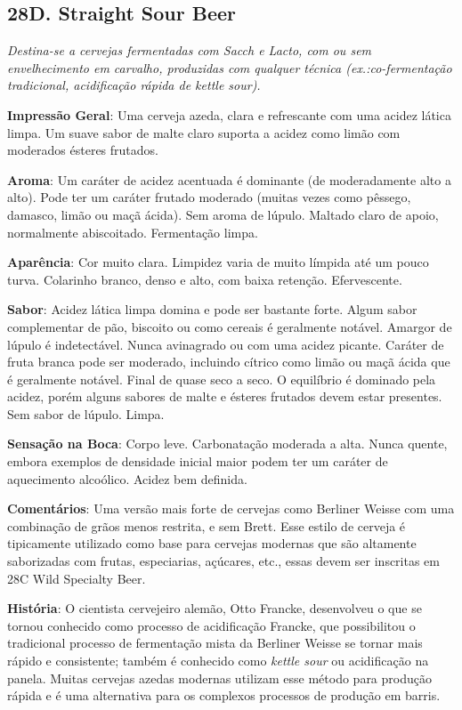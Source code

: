 \subsection*{28D. Straight Sour Beer}
\textit{Destina-se a cervejas fermentadas com Sacch e Lacto, com ou sem envelhecimento em carvalho, produzidas com qualquer técnica (ex.:co-fermentação tradicional, acidificação rápida de kettle sour).}

\textbf{Impressão Geral}: Uma cerveja azeda, clara e refrescante com uma acidez lática limpa. Um suave sabor de malte claro suporta a acidez como limão com moderados ésteres frutados.

\textbf{Aroma}: Um caráter de acidez acentuada é dominante (de moderadamente alto a alto). Pode ter um caráter frutado moderado (muitas vezes como pêssego, damasco, limão ou maçã ácida). Sem aroma de lúpulo. Maltado claro de apoio, normalmente abiscoitado. Fermentação limpa.

\textbf{Aparência}: Cor muito clara. Limpidez varia de muito límpida até um pouco turva. Colarinho branco, denso e alto, com baixa retenção. Efervescente.

\textbf{Sabor}: Acidez lática limpa domina e pode ser bastante forte. Algum sabor complementar de pão, biscoito ou como cereais é geralmente notável. Amargor de lúpulo é indetectável. Nunca avinagrado ou com uma acidez picante. Caráter de fruta branca pode ser moderado, incluindo cítrico como limão ou maçã ácida que é geralmente notável. Final de quase seco a seco. O equilíbrio é dominado pela acidez, porém alguns sabores de malte e ésteres frutados devem estar presentes. Sem sabor de lúpulo. Limpa.

\textbf{Sensação na Boca}: Corpo leve. Carbonatação moderada a alta. Nunca quente, embora exemplos de densidade inicial maior podem ter um caráter de aquecimento alcoólico. Acidez bem definida.

\textbf{Comentários}: Uma versão mais forte de cervejas como Berliner Weisse com uma combinação de grãos menos restrita, e sem Brett. Esse estilo de cerveja é tipicamente utilizado como base para cervejas modernas que são altamente saborizadas com frutas, especiarias, açúcares, etc., essas devem ser inscritas em 28C Wild Specialty Beer.

\textbf{História}: O cientista cervejeiro alemão, Otto Francke, desenvolveu o que se tornou conhecido como processo de acidificação Francke, que possibilitou o tradicional processo de fermentação mista da Berliner Weisse se tornar mais rápido e consistente; também é conhecido como \textit{kettle sour} ou acidificação na panela. Muitas cervejas azedas modernas utilizam esse método para produção rápida e é uma alternativa para os complexos processos de produção em barris.

